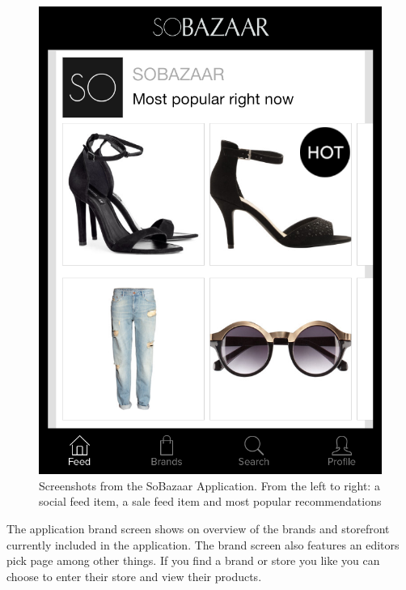 \begin{figure}[H]
\begin{minipage}{.30\linewidth}
				\includegraphics[height=1.5\linewidth]{image/SoBazaarmostpop.png}
		\end{minipage}
		\caption[SoBazaar newsfeed screenshots - version 0.5.1]{Screenshots from the SoBazaar Application. From the left to right: a social feed item, a sale feed item and most popular recommendations}
		\label{figure:SoBazaarfeed}
	\end{figure}

	The application brand screen shows on overview of the brands and storefront currently included in the application. The brand screen also features an editors pick page among other things. If you find a brand or store you like you can choose to enter their store and view their products.

